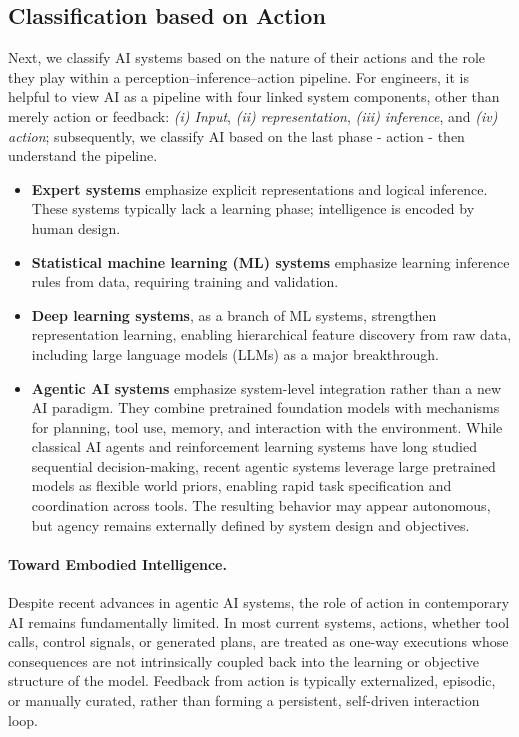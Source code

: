 \documentclass[12pt]{article}
\begin{document}
\subsection{Classification based on Action}
Next, we classify AI systems based on the nature of their actions and the role they play within a perception–inference–action pipeline. For engineers, it is helpful to view AI as a pipeline with four linked system components, other than merely action or feedback:
\emph{(i) Input}, \emph{(ii) representation}, \emph{(iii) inference}, and \emph{(iv) action}; subsequently, we classify AI based on the last phase - action - then understand the pipeline. 
\begin{itemize}
\item \textbf{Expert systems} emphasize explicit representations and logical inference. These systems typically lack a learning phase; intelligence is encoded by human design.
\item \textbf{Statistical machine learning (ML) systems} emphasize learning inference rules from data, requiring training and validation.
\item \textbf{Deep learning systems}, as a branch of ML systems, strengthen representation learning, enabling hierarchical feature discovery from raw data, including large language models (LLMs) as a major breakthrough.
\item \textbf{Agentic AI systems} emphasize system-level integration rather than a new AI paradigm. They combine pretrained foundation models with mechanisms for planning, tool use, memory, and interaction with the environment. While classical AI agents and reinforcement learning systems have long studied sequential decision-making, recent agentic systems leverage large pretrained models as flexible world priors, enabling rapid task specification and coordination across tools. The resulting behavior may appear autonomous, but agency remains externally defined by system design and objectives.
\end{itemize}

\paragraph{Toward Embodied Intelligence.} Despite recent advances in agentic AI systems, the role of action in contemporary AI remains fundamentally limited. In most current systems, actions, whether tool calls, control signals, or generated plans, are treated as one-way executions whose consequences are not intrinsically coupled back into the learning or objective structure of the model. Feedback from action is typically externalized, episodic, or manually curated, rather than forming a persistent, self-driven interaction loop. 
\end{document}
